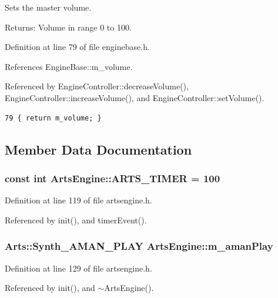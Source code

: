 Sets the master volume. \begin{Desc}
\item[Returns:]Volume in range 0 to 100. \end{Desc}


Definition at line 79 of file enginebase.h.

References Engine\-Base::m\_\-volume.

Referenced by Engine\-Controller::decrease\-Volume(), Engine\-Controller::increase\-Volume(), and Engine\-Controller::set\-Volume().



\footnotesize\begin{verbatim}79 { return m_volume; }
\end{verbatim}\normalsize 


\subsection{Member Data Documentation}
\subsubsection{\setlength{\rightskip}{0pt plus 5cm}const int {\bf Arts\-Engine::ARTS\_\-TIMER} = 100\hspace{0.3cm}{\tt  [static, private]}}\label{classArtsEngine_ArtsEnginev0}




Definition at line 119 of file artsengine.h.

Referenced by init(), and timer\-Event().
\subsubsection{\setlength{\rightskip}{0pt plus 5cm}Arts::Synth\_\-AMAN\_\-PLAY {\bf Arts\-Engine::m\_\-aman\-Play}\hspace{0.3cm}{\tt  [private]}}\label{classArtsEngine_ArtsEnginer7}




Definition at line 129 of file artsengine.h.

Referenced by init(), and $\sim$Arts\-Engine().

